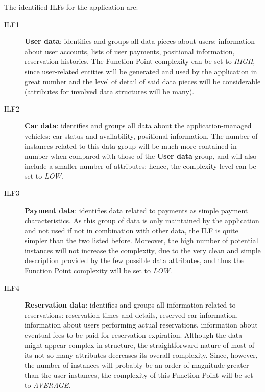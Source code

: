 The identified ILFs for the application are:
\begin{description}
\item[ILF1] \textbf{User data}: identifies and groups all data pieces about users: information about user accounts, lists of user payments, positional information, reservation histories. The Function Point complexity can be set to \textit{HIGH}, since user-related entities will be generated and used by the application in great number and the level of detail of said data pieces will be considerable (attributes for involved data structures will be many).
\item[ILF2] \textbf{Car data}:	identifies and groups all data about the application-managed vehicles: car status and availability, positional information. The number of instances related to this data group will be much more contained in number when compared with those of the \textbf{User data} group, and will also include a smaller number of attributes; hence, the complexity level can be set to \textit{LOW}.
\item[ILF3] \textbf{Payment data}: identifies data related to payments as simple payment characteristics. As this group of data is only maintained by the application and not used if not in combination with other data, the ILF is quite simpler than the two listed before. Moreover, the high number of potential instances will not increase the complexity, due to the very clean and simple description provided by the few possible data attributes, and thus the Function Point complexity will be set to \textit{LOW}.
\item[ILF4] \textbf{Reservation data}: identifies and groups all information related to reservations: reservation times and details, reserved car information, information about users performing actual reservations, information about eventual fees to be paid for reservation expiration. Although the data might appear complex in structure, the straightforward nature of most of its not-so-many attributes decreases its overall complexity. Since, however, the number of instances will probably be an order of magnitude greater than the user instances, the complexity of this Function Point will be set to \textit{AVERAGE}.

\end{description}
